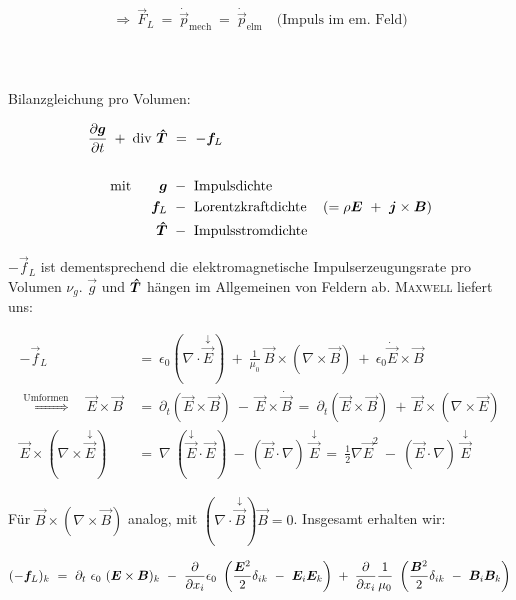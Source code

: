 \begin{equation*}
\Rightarrow \ \vec{F}_L \ = \ \dot{\vec{p}}_{\text{mech}} \ = \  \dot{\vec{p}}_{\text{elm}} \quad \text{(Impuls im em. Feld)}
\end{equation*}
\ \\
\ \\
\ \\

Bilanzgleichung pro Volumen:

\begin{align*}
\frac{\partial{\bm{g}}}{\partial{t}} \; + \; \text{div } \bm{\hat{T}} & \ = \ - \bm{f}_L \\
\ \\
\text{mit} \qquad \bm{g} & \ - \ \text{Impulsdichte}\\
\bm{f}_L & \ - \ \text{Lorentzkraftdichte} \quad \left( = \rho\bm{E} \ + \ \bm{j}\times\bm{B}\right)\\
\bm{\hat{T}} & \ - \ \text{Impulsstromdichte}
\end{align*}

$ - \vec{f}_L$ ist dementsprechend die elektromagnetische Impulserzeugungsrate pro Volumen $\nu_g$.
$\vec{g}$ und $\bm{\hat{T}}$ hängen im Allgemeinen von Feldern ab. \textsc{Maxwell} liefert uns:

\begin{align*}
- \vec{f}_L \ &= \ \epsilon_0 ( \nabla \cdot\overset{\downarrow}{\vec{E}} ) \ + \ \frac{1}{\mu_0} \ \vec{B} \times (\nabla \times \vec{B}) \ + \ \epsilon_0 \dot{\vec{E}} \times \vec{B}\\
\overset{\text{Umformen}}{\Longrightarrow} \quad\vec{E}\times\vec{B} \ &= \ \partial_t ( \vec{E} \times \vec{B} ) \ - \ \vec{E}\times\dot{\vec{B}} \ =  \ \partial_t (\vec{E}\times\vec{B}) \ + \ \vec{E}\times (\nabla\times\vec{E})\\
\vec{E}\times ( \nabla\times \overset{\downarrow}{\vec{E}} ) \ &= \ \nabla \ (\overset{\downarrow}{\vec{E}}\cdot\vec{E} ) \ - \ ( \vec{E}\cdot\nabla ) \ \overset{\downarrow}{\vec{E}} \ = \ \frac{1}{2}\nabla\vec{E}^2 \ - \ ( \vec{E}\cdot\nabla) \ \overset{\downarrow}{\vec{E}}
\end{align*}

Für $\vec{B}\times(\nabla\times\vec{B})$ analog, mit $(\nabla\cdot\overset{\downarrow}{\vec{B}})\vec{B}=0$. Insgesamt erhalten wir:

\begin{equation*}
(-\vec{f}_L)_k \ = \ \partial_t \ \epsilon_0 \ (\vec{E}\times\vec{B})_k \ - \ \pdiff{}{x_i} \epsilon_0 \ \left(\frac{\vec{E}^2}{2} \delta_{ik} \ - \ \vec{E}_i \vec{E}_k \right) \; + \; \pdiff{}{x_i} \frac{1}{\mu_0} \ \left(\frac{\vec{B}^2}{2}\delta_{ik} \ - \ \vec{B}_i \vec{B}_k \right) 
\end{equation*}

